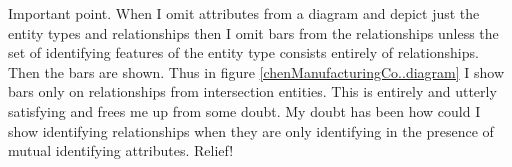 \begin{notebox}
Important point. When I omit attributes from a diagram and depict just the entity types and relationships then I omit bars from the relationships unless the set of identifying features of the entity type consists entirely of relationships. Then the bars are shown.
Thus in figure \ref{chenManufacturingCo..diagram} I show bars only on relationships from intersection entities. This is entirely and utterly satisfying and frees me up from some doubt. My doubt has been how could I show identifying relationships when they are only identifying in the presence of 
mutual identifying attributes. Relief! 
\end{notebox}

